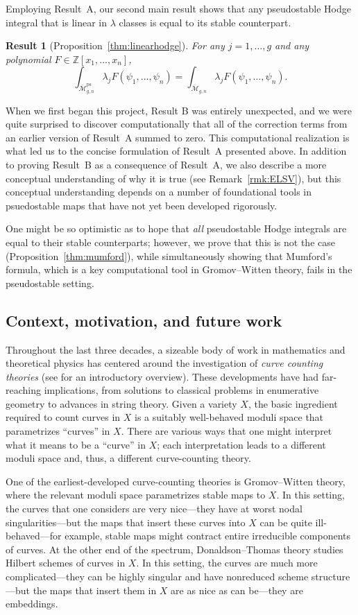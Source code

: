 \documentclass[12pt]{amsart}
\newcounter{intro}[section]
\newtheorem{result}[intro]{Result}
\theoremstyle{definition}
\newcommand{\M}{\overline{\mathcal{M}}}
\newcommand{\ps}{\mathrm{ps}}
\newcommand{\Z}{\mathbb{Z}}
\numberwithin{equation}{section}
\begin{document}
Employing Result~A, our second main result shows that any pseudostable Hodge integral that is linear in $\lambda$ classes is equal to its stable counterpart.

\begin{result}[Proposition~\ref{thm:linearhodge}]
For any $j=1,\dots,g$ and any polynomial $F\in\Z[x_1,\dots,x_n]$,
\[
\int_{\M_{g,n}^\ps}\lambda_jF(\psi_1,\dots,\psi_n)=\int_{\M_{g,n}}\lambda_jF(\psi_1,\dots,\psi_n).
\]
\end{result}

When we first began this project, Result B was entirely unexpected, and we were quite surprised to discover computationally that all of the correction terms from an earlier version of Result~A summed to zero. This computational realization is what led us to the concise formulation of Result~A presented above. In addition to proving Result~B as a consequence of Result~A, we also describe a more conceptual understanding of why it is true (see Remark~\ref{rmk:ELSV}), but this conceptual understanding depends on a number of foundational tools in psuedostable maps that have not yet been developed rigorously.

One might be so optimistic as to hope that \emph{all} pseudostable Hodge integrals are equal to their stable counterparts; however, we prove that this is not the case (Proposition~\ref{thm:mumford}), while simultaneously showing that Mumford's formula, which is a key computational tool in Gromov--Witten theory, fails in the pseudostable setting.

\subsection{Context, motivation, and future work} Throughout the last three decades, a sizeable body of work in mathematics and theoretical physics has centered around the investigation of \emph{curve counting theories} (see \cite{PT} for an introductory overview). These developments have had far-reaching implications, from solutions to classical problems in enumerative geometry to advances in string theory. Given a variety $X$, the basic ingredient required to count curves in $X$ is a suitably well-behaved moduli space that parametrizes ``curves'' in $X$. There are various ways that one might interpret what it means to be a ``curve'' in $X$; each interpretation leads to a different moduli space and, thus, a different curve-counting theory.

One of the earliest-developed curve-counting theories is Gromov--Witten theory, where the relevant moduli space parametrizes stable maps to $X$. In this setting, the curves that one considers are very nice---they have at worst nodal singularities---but the maps that insert these curves into $X$ can be quite ill-behaved---for example, stable maps might contract entire irreducible components of curves. At the other end of the spectrum, Donaldson--Thomas theory studies Hilbert schemes of curves in $X$. In this setting, the curves are much more complicated---they can be highly singular and have nonreduced scheme structure---but the maps that insert them in $X$ are as nice as can be---they are embeddings.
\end{document}
